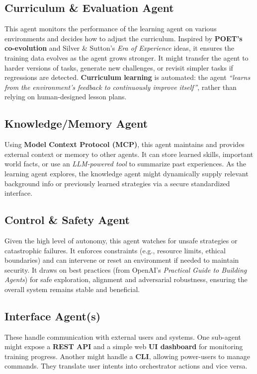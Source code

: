 \documentclass{article}
\begin{document}
\subsection{Curriculum \& Evaluation Agent}
This agent monitors the performance of the learning agent on various environments and decides how to adjust the curriculum. Inspired by \textbf{POET’s co-evolution} and Silver \& Sutton’s \emph{Era of Experience} ideas, it ensures the training data evolves as the agent grows stronger. It might transfer the agent to harder versions of tasks, generate new challenges, or revisit simpler tasks if regressions are detected. \textbf{Curriculum learning} is automated: the agent \emph{“learns from the environment’s feedback to continuously improve itself”}, rather than relying on human-designed lesson plans.

\subsection{Knowledge/Memory Agent}
Using \textbf{Model Context Protocol (MCP)}, this agent maintains and provides external context or memory to other agents. It can store learned skills, important world facts, or use an \emph{LLM-powered tool} to summarize past experiences. As the learning agent explores, the knowledge agent might dynamically supply relevant background info or previously learned strategies via a secure standardized interface.

\subsection{Control \& Safety Agent}
Given the high level of autonomy, this agent watches for unsafe strategies or catastrophic failures. It enforces constraints (e.g., resource limits, ethical boundaries) and can intervene or reset an environment if needed to maintain security. It draws on best practices (from OpenAI’s \emph{Practical Guide to Building Agents}) for safe exploration, alignment and adversarial robustness, ensuring the overall system remains stable and beneficial.

\subsection{Interface Agent(s)}
These handle communication with external users and systems. One sub-agent might expose a \textbf{REST API} and a simple web \textbf{UI dashboard} for monitoring training progress. Another might handle a \textbf{CLI}, allowing power-users to manage commands. They translate user intents into orchestrator actions and vice versa.
\end{document}
